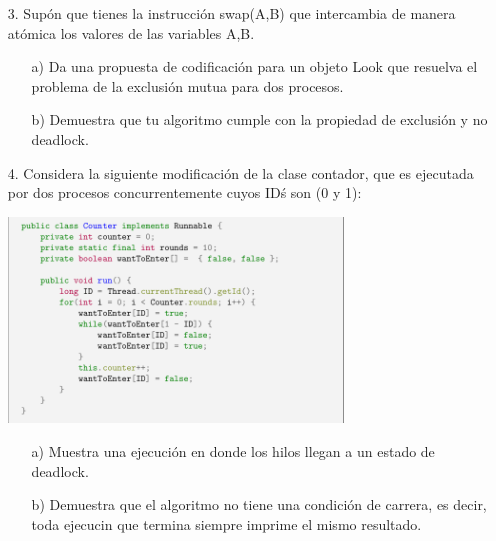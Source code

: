 \documentclass[12pt, letterpaper]{article}
\begin{document}
\begin{itemize}
\begin{itemize}

\item[a) ]Demuestra que resuelve el problema de la exclusi\'on mutua.
\item[b) ]Demuestra por qu\'e no cumple con la propiedad libre de hambruna.
\item[c) ]El algoritmo cumple con la propiedad de no deadlock?
\item[d) ]Cu\'al es la desventaja del algoritmo? Argumenta por qu\'e es dif\'icil de
generalizar.
\end{itemize}


\item[3. ]Sup\'on que tienes la instrucci\'on swap(A,B) que intercambia de manera at\'omica los valores de las variables A,B.

\begin{itemize}
\item[a) ]Da una propuesta de codificaci\'on para un objeto Look que resuelva el problema de la exclusi\'on mutua para dos procesos.
\item[b) ]Demuestra que tu algoritmo cumple con la propiedad de exclusi\'on y no deadlock.
\end{itemize}

\item[4. ] Considera la siguiente modificaci\'on de la clase contador, que es ejecutada por dos procesos concurrentemente cuyos ID\' s son (0 y 1):


\begin{center}
\includegraphics[width=0.7\textwidth]{CounterCode.png}\\
\end{center}


\begin{itemize}
\item[a) ]Muestra una ejecuci\'on en donde los hilos llegan a un estado de deadlock. 

\item[b) ] Demuestra que el algoritmo no tiene una condici\'on de carrera, es decir, toda ejecucin que termina siempre imprime el mismo resultado.
\end{itemize}




\end{itemize}
\end{document}
